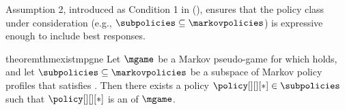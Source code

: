 
Assumption 2, introduced as Condition 1 in \citeauthor{bhandari2019global} (\citeyear{bhandari2019global}), ensures that the policy class under consideration (e.g., $\subpolicies \subseteq \markovpolicies$)
is expressive enough to include best responses.

\begin{restatable}{theorem}{thmexistmpgne}
\label{thm:existence_of_mpgne}
Let $\mgame$
be a Markov pseudo-game for which  holds, 
and let $\subpolicies\subseteq \markovpolicies$ be a subspace of Markov policy profiles that satisfies . 
Then there exists a policy $\policy[][][*] \in \subpolicies$ such that $\policy[][][*]$ is an 
\MPGNE{} of $\mgame$.
\end{restatable}

    
